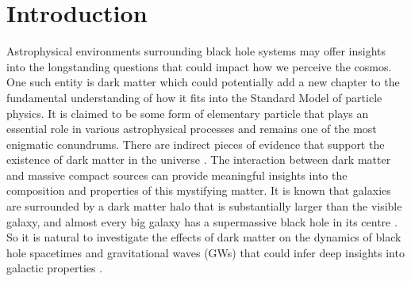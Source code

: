 \documentclass[11pt]{article}
\begin{document}
\newpage



\section{Introduction}
Astrophysical environments surrounding black hole systems may offer insights into the longstanding questions that could impact how we perceive the cosmos. 
One such entity is dark matter which could potentially add a new chapter to the fundamental understanding of how it fits into the Standard Model of particle physics. It is claimed to be some form of elementary particle that plays an essential role in various astrophysical processes and remains one of the most enigmatic conundrums. There are indirect pieces of evidence that support the existence of dark matter in the universe \cite{1990ApJ...356..359H, Navarro:1995iw, Freese:2008cz, Clowe:2006eq, Bertone:2004pz, vandenBergh:1999sa, Persic:1995ru, Corbelli:1999af, Massey:2010hh, Ellis:2010kf}. The interaction between dark matter and massive compact sources can provide meaningful insights into the composition and properties of this mystifying matter. It is known that galaxies are surrounded by a dark matter halo that is substantially larger than the visible galaxy, and almost every big galaxy has a supermassive black hole in its centre \cite{Kormendy:2013dxa, Harris:2015vxa}. So it is natural to investigate the effects of dark matter on the dynamics of black hole spacetimes and gravitational waves (GWs) that could infer deep insights into galactic properties \cite{Macedo:2013qea,Coogan:2021uqv,Baryakhtar:2022hbu,Singh:2022wvw,Bhattacharya:2023stq, Bhattacharyya:2023kbh,AbhishekChowdhuri:2023cle}.
\end{document}
